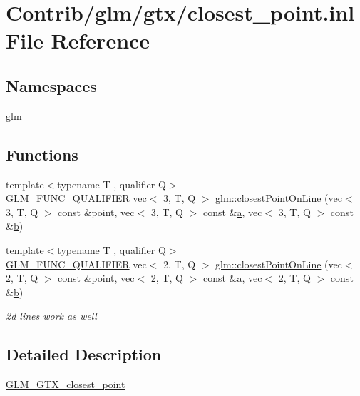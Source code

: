 \hypertarget{closest__point_8inl}{}\section{Contrib/glm/gtx/closest\+\_\+point.inl File Reference}
\label{closest__point_8inl}
\subsection*{Namespaces}
\begin{DoxyCompactItemize}
\item 
 \mbox{\hyperlink{namespaceglm}{glm}}
\end{DoxyCompactItemize}
\subsection*{Functions}
\begin{DoxyCompactItemize}
\item 
{\footnotesize template$<$typename T , qualifier Q$>$ }\\\mbox{\hyperlink{setup_8hpp_a33fdea6f91c5f834105f7415e2a64407}{G\+L\+M\+\_\+\+F\+U\+N\+C\+\_\+\+Q\+U\+A\+L\+I\+F\+I\+ER}} vec$<$ 3, T, Q $>$ \mbox{\hyperlink{group__gtx__closest__point_ga36529c278ef716986151d58d151d697d}{glm\+::closest\+Point\+On\+Line}} (vec$<$ 3, T, Q $>$ const \&point, vec$<$ 3, T, Q $>$ const \&\mbox{\hyperlink{_s_d_l__opengl__glext_8h_a3309789fc188587d666cda5ece79cf82}{a}}, vec$<$ 3, T, Q $>$ const \&\mbox{\hyperlink{_s_d_l__opengl__glext_8h_a0f71581a41fd2264c8944126dabbd010}{b}})
\item 
{\footnotesize template$<$typename T , qualifier Q$>$ }\\\mbox{\hyperlink{setup_8hpp_a33fdea6f91c5f834105f7415e2a64407}{G\+L\+M\+\_\+\+F\+U\+N\+C\+\_\+\+Q\+U\+A\+L\+I\+F\+I\+ER}} vec$<$ 2, T, Q $>$ \mbox{\hyperlink{group__gtx__closest__point_ga55bcbcc5fc06cb7ff7bc7a6e0e155eb0}{glm\+::closest\+Point\+On\+Line}} (vec$<$ 2, T, Q $>$ const \&point, vec$<$ 2, T, Q $>$ const \&\mbox{\hyperlink{_s_d_l__opengl__glext_8h_a3309789fc188587d666cda5ece79cf82}{a}}, vec$<$ 2, T, Q $>$ const \&\mbox{\hyperlink{_s_d_l__opengl__glext_8h_a0f71581a41fd2264c8944126dabbd010}{b}})
\begin{DoxyCompactList}\small\item\em 2d lines work as well \end{DoxyCompactList}\end{DoxyCompactItemize}


\subsection{Detailed Description}
\mbox{\hyperlink{group__gtx__closest__point}{G\+L\+M\+\_\+\+G\+T\+X\+\_\+closest\+\_\+point}} 
